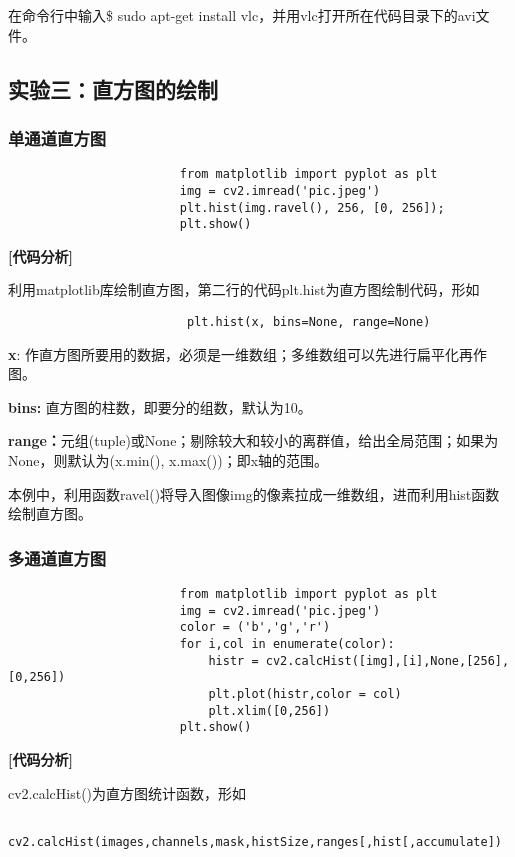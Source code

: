 \documentclass{article}
\begin{document}
在命令行中输入\$ sudo apt-get install vlc，并用vlc打开所在代码目录下的avi文件。



\subsection{实验三：直方图的绘制}
\subsubsection{单通道直方图}
\begin{lstlisting}
                        from matplotlib import pyplot as plt
                        img = cv2.imread('pic.jpeg')
                        plt.hist(img.ravel(), 256, [0, 256]);
                        plt.show()
\end{lstlisting}
\indent\textbf{[代码分析]}

利用matplotlib库绘制直方图，第二行的代码plt.hist为直方图绘制代码，形如
\begin{lstlisting}
                         plt.hist(x, bins=None, range=None)
\end{lstlisting}

\textbf{x}: 作直方图所要用的数据，必须是一维数组；多维数组可以先进行扁平化再作图。

\textbf{bins: }直方图的柱数，即要分的组数，默认为10。

\textbf{range：}元组(tuple)或None；剔除较大和较小的离群值，给出全局范围；如果为None，则默认为(x.min(), x.max())；即x轴的范围。

本例中，利用函数ravel()将导入图像img的像素拉成一维数组，进而利用hist函数绘制直方图。


\subsubsection{多通道直方图}
\begin{lstlisting}
                        from matplotlib import pyplot as plt
                        img = cv2.imread('pic.jpeg')
                        color = ('b','g','r')
                        for i,col in enumerate(color):
                            histr = cv2.calcHist([img],[i],None,[256],[0,256])
                            plt.plot(histr,color = col)
                            plt.xlim([0,256])
                        plt.show()
\end{lstlisting}

\indent\textbf{[代码分析]}

cv2.calcHist()为直方图统计函数，形如
\begin{lstlisting}
            cv2.calcHist(images,channels,mask,histSize,ranges[,hist[,accumulate])
\end{lstlisting}
\end{document}

